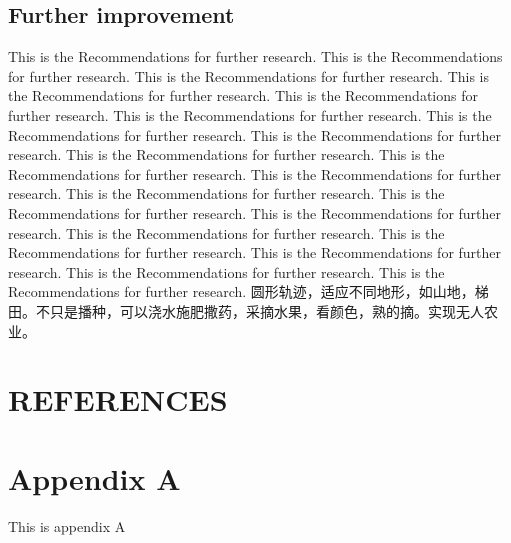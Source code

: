 \documentclass[12pt]{article}
\begin{document}
\begin{flushleft}
\subsection{Further improvement}
This is the Recommendations for further research. This is the Recommendations for further research. This is the Recommendations for further research. This is the Recommendations for further research. This is the Recommendations for further research. This is the Recommendations for further research. This is the Recommendations for further research. This is the Recommendations for further research. This is the Recommendations for further research. This is the Recommendations for further research. This is the Recommendations for further research. This is the Recommendations for further research. This is the Recommendations for further research. This is the Recommendations for further research. This is the Recommendations for further research. This is the Recommendations for further research. This is the Recommendations for further research. This is the Recommendations for further research. This is the Recommendations for further research. \cite{wu2004modeling}
圆形轨迹，适应不同地形，如山地，梯田。不只是播种，可以浇水施肥撒药，采摘水果，看颜色，熟的摘。实现无人农业。



\newpage
\section{REFERENCES}



\newpage
\appendix
\renewcommand{\appendixname}{Appendix~\Alph{section}}

\section{Appendix A}
This is appendix A

\end{flushleft}
\end{document}
